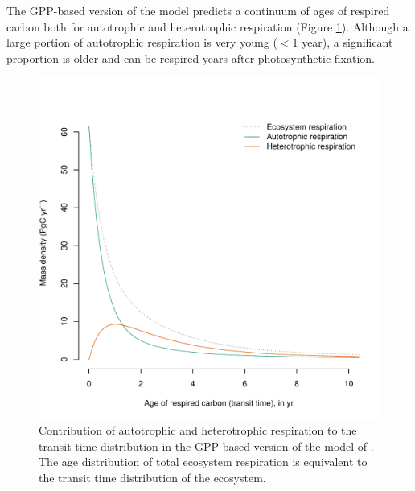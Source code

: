 \documentclass[bg, manuscript]{copernicus}
\begin{document}
The GPP-based version of the model predicts a continuum of ages of respired carbon both for autotrophic and heterotrophic respiration (Figure \ref{fig:TTcontributions}). Although a large portion of autotrophic respiration is very young ($< 1$ year), a significant proportion is older and can be respired years after photosynthetic fixation. 


\begin{figure}[t]
   \centering
   \includegraphics[scale=0.9]{TT_contributions.pdf} %
   \caption{Contribution of autotrophic and heterotrophic respiration to the transit time distribution in the GPP-based version of the model of \citet{Emanuel1981}. The age distribution of total ecosystem respiration is equivalent to the transit time distribution of the ecosystem. }
   \label{fig:TTcontributions}
\end{figure}
\end{document}
